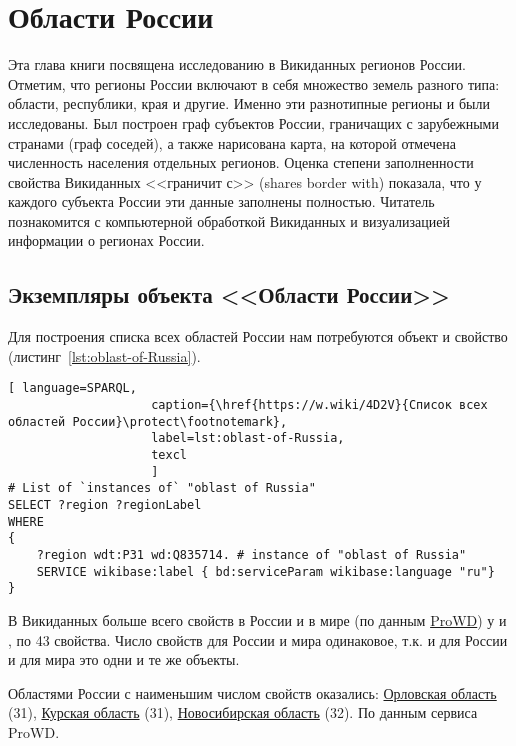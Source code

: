 ﻿\chapter{Области России}
\label{ch:oblast-of-Russia}
Эта глава книги посвящена исследованию в Викиданных регионов России. 
Отметим, что регионы России включают в себя множество земель разного 
типа: области, республики, края и другие. Именно эти разнотипные регионы 
и были исследованы. Был построен граф субъектов России, граничащих 
с зарубежными странами (граф соседей), а также нарисована карта, 
на которой отмечена численность населения отдельных регионов. Оценка 
степени заполненности свойства Викиданных <<граничит с>> (shares border with) 
показала, что у каждого субъекта России эти данные заполнены полностью. 
Читатель познакомится с компьютерной обработкой Викиданных и визуализацией 
информации о регионах России.

\section{Экземпляры объекта <<Области России>>}

Для построения списка всех областей России нам потребуются объект 
 и свойство  
(листинг~\protect\ref{lst:oblast-of-Russia}).

\begin{lstlisting}[ language=SPARQL, 
                    caption={\href{https://w.wiki/4D2V}{Список всех областей России}\protect\footnotemark},
                    label=lst:oblast-of-Russia,
                    texcl 
                    ]
# List of `instances of` "oblast of Russia"
SELECT ?region ?regionLabel
WHERE
{
    ?region wdt:P31 wd:Q835714. # instance of "oblast of Russia"
    SERVICE wikibase:label { bd:serviceParam wikibase:language "ru"}
}
\end{lstlisting}%

В Викиданных больше всего свойств в России и в мире (по данным \href{https://prowd.id/dashboards/68f1cfd5b84d/profile}{ProWD}) у  и , по 43 свойства. Число свойств для России и мира одинаковое, т.к. и для России и для мира это одни и те же объекты.

Областями России с наименьшим числом свойств оказались: \href{http://www.wikidata.org/entity/Q3129}{Орловская область} (\num{31}), \href{http://www.wikidata.org/entity/Q3178}{Курская область} (\num{31}), \href{http://www.wikidata.org/entity/Q5851}{Новосибирская область} (\num{32}). По данным сервиса ProWD\autocite{Russia_prowd}.

